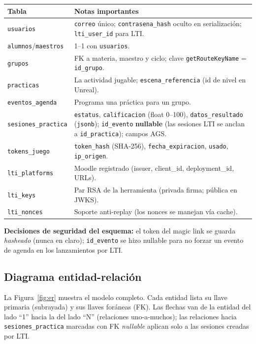 \documentclass[11pt,letterpaper]{article}
\begin{document}
\begin{longtable}{p{3.6cm} p{11cm}}
\toprule \textbf{Tabla} & \textbf{Notas importantes} \\ \midrule
\endhead
\texttt{usuarios} & \texttt{correo} único; \texttt{contrasena\_hash} oculto en serialización; \texttt{lti\_user\_id} para LTI. \\
\texttt{alumnos}/\texttt{maestros} & 1--1 con \texttt{usuarios}. \\
\texttt{grupos} & FK a materia, maestro y ciclo; clave \texttt{getRouteKeyName} = \texttt{id\_grupo}. \\
\texttt{practicas} & La actividad jugable; \texttt{escena\_referencia} (id de nivel en Unreal). \\
\texttt{eventos\_agenda} & Programa una práctica para un grupo. \\
\texttt{sesiones\_practica} & \texttt{estatus}, \texttt{calificacion} (float 0--100), \texttt{datos\_resultado} (\texttt{jsonb}); \texttt{id\_evento} \textbf{nullable} (las sesiones LTI se anclan a \texttt{id\_practica}); campos AGS. \\
\texttt{tokens\_juego} & \texttt{token\_hash} (SHA-256), \texttt{fecha\_expiracion}, \texttt{usado}, \texttt{ip\_origen}. \\
\texttt{lti\_platforms} & Moodle registrado (issuer, client\_id, deployment\_id, URLs). \\
\texttt{lti\_keys} & Par RSA de la herramienta (privada firma; pública en JWKS). \\
\texttt{lti\_nonces} & Soporte anti-replay (los nonces se manejan vía cache). \\
\bottomrule
\end{longtable}

\textbf{Decisiones de seguridad del esquema:} el token del magic link se guarda
\emph{hasheado} (nunca en claro); \texttt{id\_evento} se hizo nullable para no
forzar un evento de agenda en los lanzamientos por LTI.

\subsection{Diagrama entidad-relación}
La Figura~\ref{fig:er} muestra el modelo completo. Cada entidad lista su llave
primaria (subrayada) y sus llaves foráneas (FK). Las flechas van de la entidad
del lado ``1'' hacia la del lado ``N'' (relaciones uno-a-muchos); las relaciones
hacia \texttt{sesiones\_practica} marcadas con FK \emph{nullable} aplican solo a
las sesiones creadas por LTI.
\end{document}
